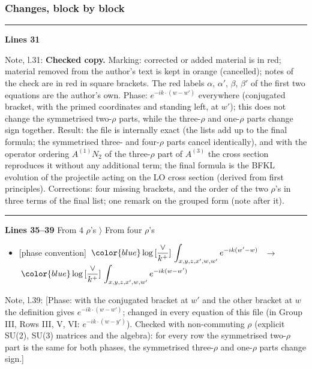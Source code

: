 \documentclass[10pt]{article}
\newenvironment{notebox}{\def\FrameCommand{{\color{notebar}\vrule width 1.5pt}\hspace{6pt}}\MakeFramed{\advance\hsize-\width\FrameRestore}\small}{\endMakeFramed}
\begin{document}
\subsubsection*{Changes, block by block}
\noindent\rule{\linewidth}{0.3pt}\par\noindent\textbf{Lines 31}\par
\begin{notebox}\textsf{\small Note, l.31:} \textbf{Checked copy.} Marking: corrected or added material is in red; material removed from the author's text is kept in orange (cancelled); notes of the check are in red in square brackets. The red labels $\alpha$, $\alpha'$, $\beta$, $\beta'$ of the first two equations are the author's own. Phase: $e^{-ik\cdot(w-w')}$ everywhere (conjugated bracket, with the primed coordinates and standing left, at $w'$); this does not change the symmetrised two-$\rho$ parts, while the three-$\rho$ and one-$\rho$ parts change sign together. Result: the file is internally exact (the lists add up to the final formula; the symmetrised three- and four-$\rho$ parts cancel identically), and with the operator ordering $A^{(1)}N_{2}$ of the three-$\rho$ part of $A^{(3)}$ the cross section reproduces it without any additional term; the final formula is the BFKL evolution of the projectile acting on the LO cross section (derived from first principles). Corrections: four missing brackets, and the order of the two $\rho$'s in three terms of the final list; one remark on the grouped form (note after it).\end{notebox}
\noindent\rule{\linewidth}{0.3pt}\par\noindent\textbf{Lines 35--39} \quad \textsf{From $4$ $\rho$'s $\rangle$ From four $\rho$'s} \par
\begin{itemize}[leftmargin=2.2em,itemsep=1pt,topsep=2pt]
\item[\textbf{l.35}] \textsf{\small [phase convention]} $\displaystyle \,{\color{blue}\log{[\frac{\vee}{k^{+}}]}}\,\int_{x,y,z,x^{\prime},w,w^{\prime}}e^{-ik(w^{\prime}-w)}\,$\ $\longrightarrow$\ $\displaystyle \,{\color{blue}\log{[\frac{\vee}{k^{+}}]}}\,\int_{x,y,z,x^{\prime},w,w^{\prime}}e^{-ik(w-w^{\prime})}\,$
\end{itemize}
\begin{notebox}\textsf{\small Note, l.39:} [Phase: with the conjugated bracket at $w'$ and the other bracket at $w$ the definition gives $e^{-ik\cdot(w-w')}$; changed in every equation of this file (in Group III, Rows III, V, VI: $e^{-ik\cdot(w-y')}$). Checked with non-commuting $\rho$ (explicit SU(2), SU(3) matrices and the algebra): for every row the symmetrised two-$\rho$ part is the same for both phases, the symmetrised three-$\rho$ and one-$\rho$ parts change sign.]\end{notebox}
\end{document}
